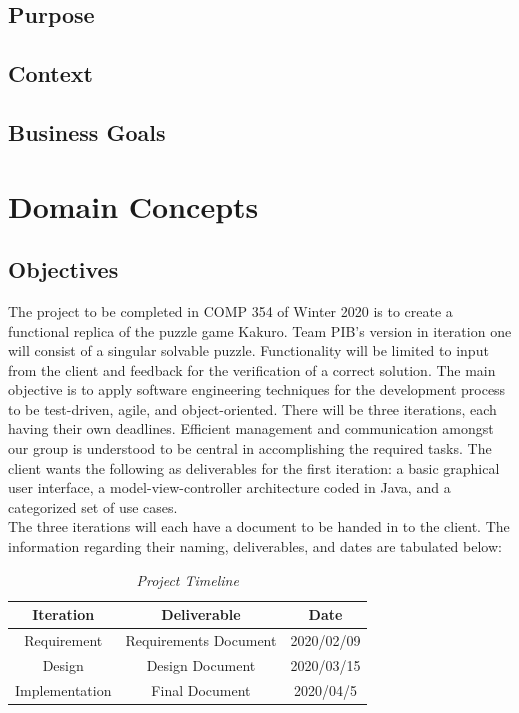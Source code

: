 \documentclass[12pt]{article}
\begin{document}
\subsection{Purpose}

\subsection{Context}

\subsection{Business Goals}

\clearpage

\section{Domain Concepts}
\subsection{Objectives}

The project to be completed in COMP 354 of Winter 2020 is to create a functional replica of the puzzle game Kakuro. Team PIB's version in iteration one will consist of a singular solvable puzzle. Functionality will be limited to input from the client and feedback for the verification of a correct solution. The main objective is to apply software engineering techniques for the development process to be test-driven, agile, and object-oriented. There will be three iterations, each having their own deadlines. Efficient management and communication amongst our group is understood to be central in accomplishing the required tasks. The client wants the following as deliverables for the first iteration: a basic graphical user interface, a model-view-controller architecture coded in Java, and a categorized set of use cases.\\  
The three iterations will each have a document to be handed in to the client. The information regarding their naming, deliverables, and dates are tabulated below:\\

\begin{table}[htbp]
\begin{center}
\begin{tabular}{| c | c | c |}
\hline
\cellcolor{gray}Iteration & \cellcolor{gray}Deliverable & \cellcolor{gray} Date \\
\hline
Requirement & Requirements Document & 2020/02/09 \\
\hline
Design & Design Document & 2020/03/15 \\
\hline
Implementation & Final Document & 2020/04/5 \\
\hline
\end{tabular}
\caption*{\textit {Project Timeline}}
\end{center}
\end{table}
\end{document}
